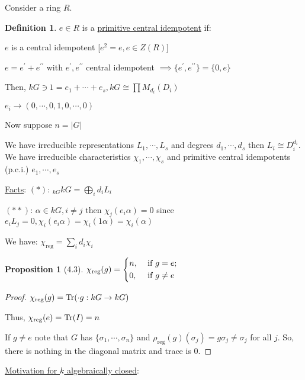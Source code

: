 \documentclass{article}
\theoremstyle{definition}
\newtheorem*{definition}{Definition}
\newtheorem{proposition}[theorem]{Proposition}
\begin{document}
Consider a ring \(R\).

\begin{definition}
    \(e\in R\) is a \underline{primitive central idempotent} if:
    
    \(e\) is a central idempotent [\(e^2 = e, e\in Z(R)\)]

    \(e = e^{\prime} + e^{\prime\prime}\) with \(e^{\prime} , e^{\prime\prime} \) central idempotent \(\implies \{ e^{\prime} , e^{\prime\prime}  \} = \{ 0, e \} \) 
\end{definition}

Then, \(kG\ni 1 = e_1 + \cdots + e_s, kG \cong \prod M_{d_i}(D_i)\)

\(e_i \to (0, \cdots , 0, 1, 0, \cdots , 0)\) 

Now suppose \(n = \vert G \vert \) 

We have irreducible representations \(L_1, \cdots , L_s\) and degrees \(d_1, \cdots , d_s\) then \(L_i \cong D_i^{d_i}\). We have irreducible characteristics \(\chi _1, \cdots , \chi _s\) and primitive central idempotents (p.c.i.) \(e_1, \cdots , e_s\) 

\underline{Facts}: \((\ast)\): \(_{kG} kG = \bigoplus_{i} d_i L_i\) 

\((\ast\ast)\): \(\alpha \in kG, i \neq j\) then \(\chi_j(e_i \alpha) = 0\) since \(e_i L_j = 0, \chi_i (e_i \alpha) =\chi_i (1 \alpha) = \chi_i (\alpha )\)  

We have: \(\chi_{\text{reg}} = \sum_{i} d_i \chi_i\) 

\begin{proposition}
    [4.3] \(\chi_{\text{reg}}(g) = \begin{dcases}
        n, &\text{ if } g=e ;\\
        0, &\text{ if } g \neq e
    \end{dcases}\) 
\end{proposition}

\begin{proof}
    \(\chi_{\text{reg}}(g) = \Tr (\cdot g: kG \to kG)\)
    
    Thus, \(\chi_{\text{reg}}(e) = \Tr(I) = n\)
    
    If \(g \neq e\) note that \(G\) has \(\{ \sigma_1, \cdots , \sigma_n \} \) and \(\rho_{\text{reg}}(g) (\sigma_j) = g \sigma_j \neq \sigma_j\) for all \(j\). So, there is nothing in the diagonal matrix and trace is \(0\).
\end{proof}

\underline{Motivation for \(k\) algebraically closed}:
\end{document}
